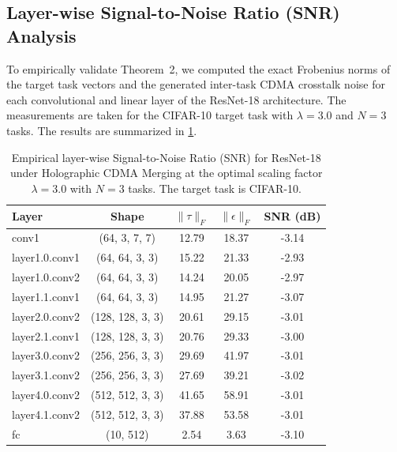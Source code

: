 \documentclass{article}
\begin{document}
\subsection{Layer-wise Signal-to-Noise Ratio (SNR) Analysis}
To empirically validate Theorem~2, we computed the exact Frobenius norms of the target task vectors and the generated inter-task CDMA crosstalk noise for each convolutional and linear layer of the ResNet-18 architecture. The measurements are taken for the CIFAR-10 target task with $\lambda=3.0$ and $N=3$ tasks. The results are summarized in \cref{tab:snr_analysis}.

\begin{table}[htbp]
\caption{Empirical layer-wise Signal-to-Noise Ratio (SNR) for ResNet-18 under Holographic CDMA Merging at the optimal scaling factor $\lambda = 3.0$ with $N = 3$ tasks. The target task is CIFAR-10.}
\label{tab:snr_analysis}
\vskip 0.15in
\begin{center}
\begin{small}
\begin{sc}
\setlength{\tabcolsep}{3pt}
\begin{tabular}{lcccc}
\toprule
Layer & Shape & $\|\tau\|_F$ & $\|\epsilon\|_F$ & SNR (dB) \\
\midrule
conv1 & (64, 3, 7, 7) & 12.79 & 18.37 & -3.14 \\
layer1.0.conv1 & (64, 64, 3, 3) & 15.22 & 21.33 & -2.93 \\
layer1.0.conv2 & (64, 64, 3, 3) & 14.24 & 20.05 & -2.97 \\
layer1.1.conv1 & (64, 64, 3, 3) & 14.95 & 21.27 & -3.07 \\
layer2.0.conv2 & (128, 128, 3, 3) & 20.61 & 29.15 & -3.01 \\
layer2.1.conv1 & (128, 128, 3, 3) & 20.76 & 29.33 & -3.00 \\
layer3.0.conv2 & (256, 256, 3, 3) & 29.69 & 41.97 & -3.01 \\
layer3.1.conv2 & (256, 256, 3, 3) & 27.69 & 39.21 & -3.02 \\
layer4.0.conv2 & (512, 512, 3, 3) & 41.65 & 58.91 & -3.01 \\
layer4.1.conv2 & (512, 512, 3, 3) & 37.88 & 53.58 & -3.01 \\
fc & (10, 512) & 2.54 & 3.63 & -3.10 \\
\bottomrule
\end{tabular}
\end{sc}
\end{small}
\end{center}
\vskip -0.1in
\end{table}
\end{document}
